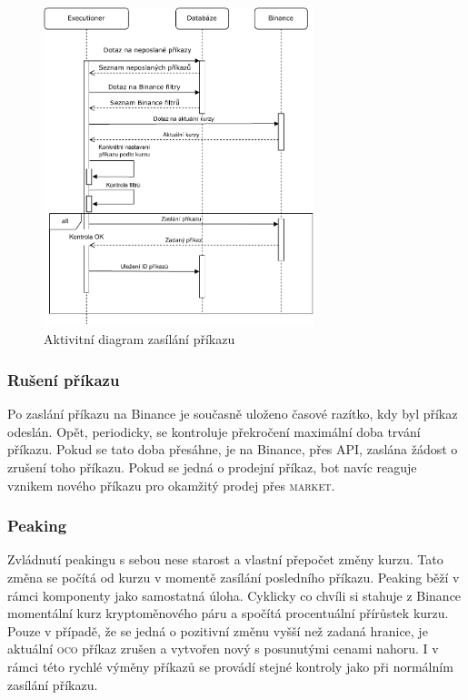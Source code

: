 \begin{figure}
    \centering
    \includegraphics[width=0.7\textwidth]{Figures/Trading-bot-sequence.pdf}
    \caption{Aktivitní diagram zasílání příkazu}
    \label{figure:sending-trade-order}
\end{figure}

\subsubsection{Rušení příkazu}
Po zaslání příkazu na Binance je současně uloženo časové razítko, kdy byl příkaz odeslán. Opět, periodicky, se kontroluje překročení maximální doba trvání příkazu. Pokud se tato doba přesáhne,
je na Binance, přes API, zaslána žádost o zrušení toho příkazu. Pokud se jedná o prodejní příkaz, bot navíc reaguje vznikem nového příkazu pro okamžitý prodej přes \textsc{market}.

\subsubsection{Peaking}
Zvládnutí peakingu s sebou nese starost a vlastní přepočet změny kurzu. Tato změna se počítá od kurzu v momentě zasílání posledního příkazu. Peaking běží v rámci komponenty jako samostatná úloha.
Cyklicky co chvíli si stahuje z Binance momentální kurz kryptoměnového páru a spočítá procentuální přírůstek kurzu. Pouze v případě, že se jedná o pozitivní změnu vyšší než zadaná hranice, je
aktuální \textsc{oco} příkaz zrušen a vytvořen nový s posunutými cenami nahoru. I v rámci této rychlé výměny příkazů se provádí stejné kontroly jako při normálním zasílání příkazu.


